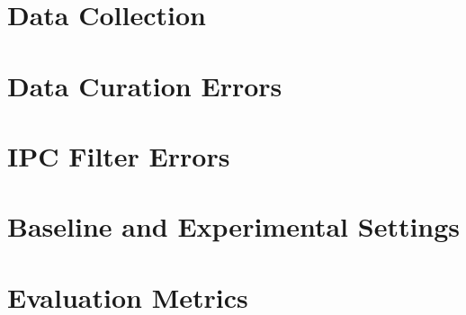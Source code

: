 \section{Data Collection}
\section{Data Curation Errors}
\section{IPC Filter Errors}
\section{Baseline and Experimental Settings}
\section{Evaluation Metrics}


